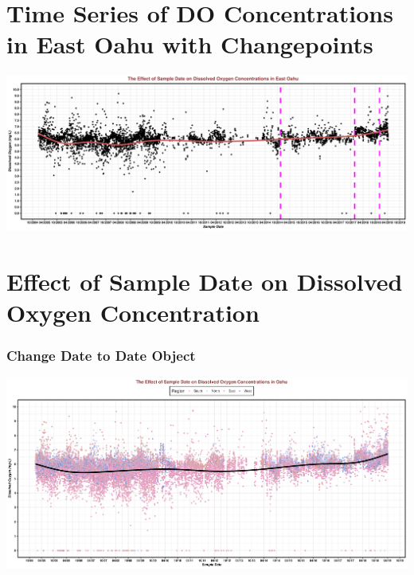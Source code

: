 \documentclass[12pt,]{article}
\newenvironment{Shaded}{\begin{snugshade}}{\end{snugshade}}
\newcommand{\KeywordTok}[1]{\textcolor[rgb]{0.13,0.29,0.53}{\textbf{#1}}}
\newcommand{\DataTypeTok}[1]{\textcolor[rgb]{0.13,0.29,0.53}{#1}}
\newcommand{\StringTok}[1]{\textcolor[rgb]{0.31,0.60,0.02}{#1}}
\newcommand{\OperatorTok}[1]{\textcolor[rgb]{0.81,0.36,0.00}{\textbf{#1}}}
\newcommand{\NormalTok}[1]{#1}
\begin{document}
\section{Time Series of DO Concentrations in East Oahu with
Changepoints}\label{time-series-of-do-concentrations-in-east-oahu-with-changepoints}

\includegraphics{Garcia_ENV872_Project_files/figure-latex/East Oahu-1.pdf}

\section{Effect of Sample Date on Dissolved Oxygen
Concentration}\label{effect-of-sample-date-on-dissolved-oxygen-concentration}

\subsubsection{Change Date to Date
Object}\label{change-date-to-date-object}

\begin{Shaded}
\end{Shaded}

\includegraphics{Garcia_ENV872_Project_files/figure-latex/DO-1.pdf}
\end{document}
